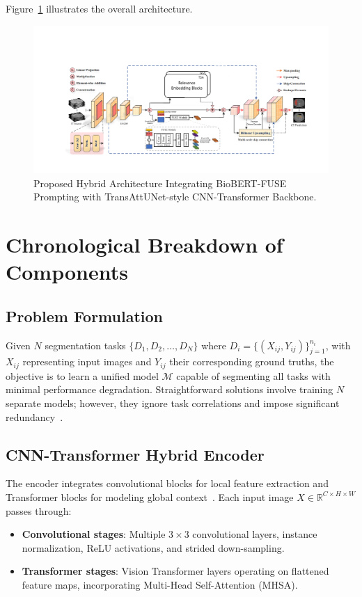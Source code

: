 \documentclass{cls/iutbscthesis}
\begin{document}
Figure~\ref{fig:proposed_pipeline} illustrates the overall architecture.

\begin{figure}[h!]
    \centering
    \includegraphics[width=\textwidth]{figs/proposed_pipeline2.png}
    \caption{Proposed Hybrid Architecture Integrating BioBERT-FUSE Prompting with TransAttUNet-style CNN-Transformer Backbone.}
    \label{fig:proposed_pipeline}
\end{figure}

\section{Chronological Breakdown of Components}

\subsection{Problem Formulation}

Given $N$ segmentation tasks $\{D_1, D_2, \ldots, D_N\}$ where $D_i = \{(X_{ij}, Y_{ij})\}_{j=1}^{n_i}$, with $X_{ij}$ representing input images and $Y_{ij}$ their corresponding ground truths, the objective is to learn a unified model $\mathcal{M}$ capable of segmenting all tasks with minimal performance degradation. Straightforward solutions involve training $N$ separate models; however, they ignore task correlations and impose significant redundancy~\cite{ye2023uniseg}.

\subsection{CNN-Transformer Hybrid Encoder}

The encoder integrates convolutional blocks for local feature extraction and Transformer blocks for modeling global context~\cite{ronneberger2015unet,vaswaniAttention}. 
Each input image $X \in \mathbb{R}^{C \times H \times W}$ passes through:
\begin{itemize}
    \item \textbf{Convolutional stages}: Multiple $3\times3$ convolutional layers, instance normalization, ReLU activations, and strided down-sampling.
    \item \textbf{Transformer stages}: Vision Transformer layers operating on flattened feature maps, incorporating Multi-Head Self-Attention (MHSA).
\end{itemize}
\end{document}

